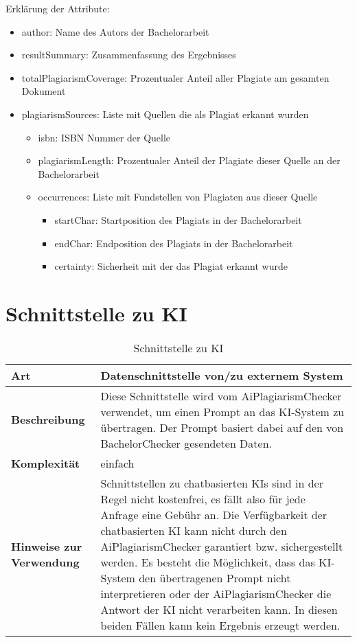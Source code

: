 Erklärung der Attribute:
\begin{itemize}
    \item author: Name des Autors der Bachelorarbeit
    \item resultSummary: Zusammenfassung des Ergebnisses
    \item totalPlagiarismCoverage: Prozentualer Anteil aller Plagiate am gesamten Dokument
    \item plagiarismSources: Liste mit Quellen die als Plagiat erkannt wurden
    \begin{itemize}
        \item isbn: ISBN Nummer der Quelle
        \item plagiarismLength: Prozentualer Anteil der Plagiate dieser Quelle an der Bachelorarbeit
        \item occurrences: Liste mit Fundstellen von Plagiaten aus dieser Quelle
        \begin{itemize}
            \item startChar: Startposition des Plagiats in der Bachelorarbeit
            \item endChar: Endposition des Plagiats in der Bachelorarbeit
            \item certainty: Sicherheit mit der das Plagiat erkannt wurde
        \end{itemize}
    \end{itemize}
\end{itemize}


\section{Schnittstelle zu KI}\label{sec:schnittstelle-ki}

\begin{table}[H]
    \label{tab:schnittstelle-ki}
    \begin{tabularx}{\textwidth}{|l|X|}
        \hline
        \textbf{Art}         & Datenschnittstelle von/zu externem System \\
        \hline
        \textbf{Beschreibung} & Diese Schnittstelle wird vom AiPlagiarismChecker verwendet, um einen Prompt an das KI-System zu übertragen.
        Der Prompt basiert dabei auf den von BachelorChecker gesendeten Daten. \\
        \hline
        \textbf{Komplexität} & einfach                                   \\
        \hline
        \textbf{Hinweise zur Verwendung} & Schnittstellen zu chatbasierten KIs sind in der Regel nicht kostenfrei, es fällt also für jede Anfrage eine Gebühr an.
        Die Verfügbarkeit der chatbasierten KI kann nicht durch den AiPlagiarismChecker garantiert bzw. sichergestellt werden.
        Es besteht die Möglichkeit, dass das KI-System den übertragenen Prompt nicht interpretieren oder der AiPlagiarismChecker die Antwort der KI nicht verarbeiten kann.
        In diesen beiden Fällen kann kein Ergebnis erzeugt werden. \\
        \hline
    \end{tabularx}
    \caption {Schnittstelle zu KI}
\end{table}